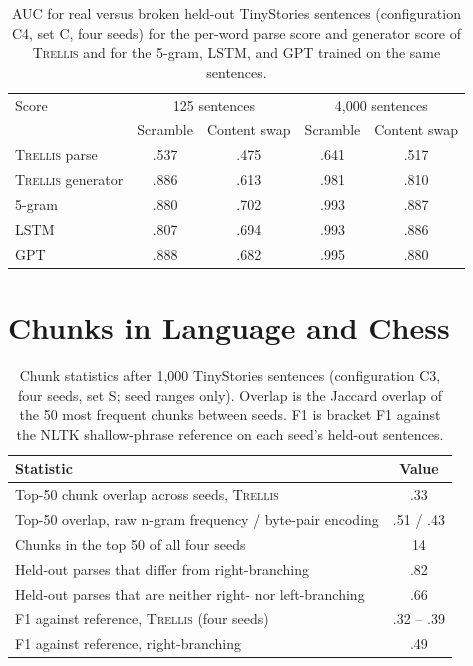 \documentclass[11pt,letterpaper]{article}
\newcommand{\trellis}{\textsc{Trellis}}
\begin{document}
\begin{table}[h]
\caption{AUC for real versus broken held-out TinyStories sentences (configuration C4, set C, four seeds) for the per-word parse score and generator score of \trellis{} and for the 5-gram, LSTM, and GPT trained on the same sentences.}
\label{tab:auc}
\begin{center}
\small
\begin{tabular}{lcccc}
\toprule
Score & \multicolumn{2}{c}{125 sentences} & \multicolumn{2}{c}{4,000 sentences} \\
 & Scramble & Content swap & Scramble & Content swap \\
\midrule
\trellis{} parse & .537 & .475 & .641 & .517 \\
\trellis{} generator & .886 & .613 & .981 & .810 \\
5-gram & .880 & .702 & .993 & .887 \\
LSTM & .807 & .694 & .993 & .886 \\
GPT & .888 & .682 & .995 & .880 \\
\bottomrule
\end{tabular}
\end{center}
\end{table}

\section{Chunks in Language and Chess}

\begin{table}[h]
\caption{Chunk statistics after 1,000 TinyStories sentences (configuration C3, four seeds, set S; seed ranges only). Overlap is the Jaccard overlap of the 50 most frequent chunks between seeds.
F1 is bracket F1 against the NLTK shallow-phrase reference on each seed's held-out sentences.}
\label{tab:chunks}
\begin{center}
\small
\begin{tabular}{lc}
\toprule
Statistic & Value \\
\midrule
Top-50 chunk overlap across seeds, \trellis{} & .33 \\
Top-50 overlap, raw n-gram frequency / byte-pair encoding & .51 / .43 \\
Chunks in the top 50 of all four seeds & 14 \\
Held-out parses that differ from right-branching & .82 \\
Held-out parses that are neither right- nor left-branching & .66 \\
F1 against reference, \trellis{} (four seeds) & .32 -- .39 \\
F1 against reference, right-branching & .49 \\
\bottomrule
\end{tabular}
\end{center}
\end{table}
\end{document}
